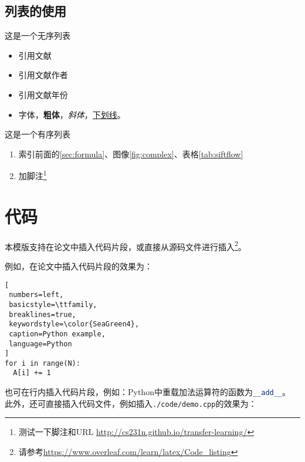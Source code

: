 \subsection{列表的使用}
\label{sec:font:list}

这是一个无序列表
\begin{itemize}
    \item 引用文献\cite{long2015fully}
    \item 引用文献作者\citeauthor{long2015fully}
    \item 引用文献年份\citeyear{long2015fully} 
    \item 字体{\color{red}{变红}}，\textbf{粗体}，\textit{斜体}，\underline{下划线}。
\end{itemize}

这是一个有序列表
\begin{enumerate}
    \item 索引前面的\autoref{sec:formula}、图像\ref{fig:complex}、表格\ref{tab:siftflow}
    \item 加脚注\footnote{测{试一下}脚注和URL \url{http://cs231n.github.io/transfer-learning/}}
\end{enumerate}

\section{代码}

本模版支持在论文中插入代码片段，或直接从源码文件进行插入\footnote{请参考\url{https://www.overleaf.com/learn/latex/Code_listing}}。

例如，在论文中插入代码片段的效果为：

\begin{lstlisting}[
 numbers=left,
 basicstyle=\ttfamily,
 breaklines=true,
 keywordstyle=\color{SeaGreen4},
 caption=Python example,
 language=Python
]
for i in range(N):
  A[i] += 1
\end{lstlisting}

也可在行内插入代码片段，例如：Python中重载加法运算符的函数为\lstinline[language=Python,keywordstyle=\color{SeaGreen4}]{__add__}。
此外，还可直接插入代码文件，例如插入\texttt{./code/demo.cpp}的效果为：


